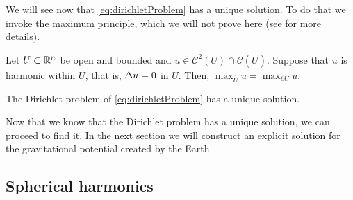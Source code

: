 \documentclass[../main.tex]{subfiles}
\begin{document}
We will see now that \cref{eq:dirichletProblem} has a unique solution. To do that we invoke the maximum principle, which we will not prove here (see \cite{evans} for more details).
\begin{theorem}
  Let $U\subset \mathbb{R}^n$ be open and bounded and $u\in\mathcal{C}^2(U)\cap \mathcal{C}(\overline{U})$. Suppose that $u$ is harmonic within $U$, that is, $\Delta u=0$ in $U$. Then, $\max_{\overline{U}}u=\max_{\partial U}u$.
\end{theorem}
\begin{corollary}
  The Dirichlet problem of \cref{eq:dirichletProblem} has a unique solution.
\end{corollary}
Now that we know that the Dirichlet problem has a unique solution, we can proceed to find it. In the next section we will construct an explicit solution for the gravitational potential created by the Earth.
\subsection{Spherical harmonics}
\end{document}
